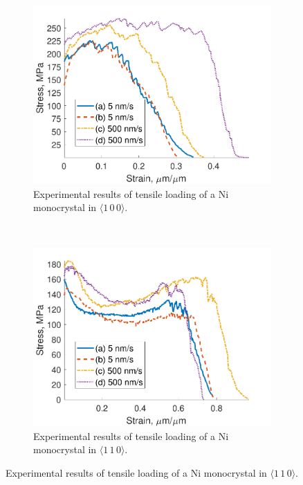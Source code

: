\begin{figure}
    \centering
    \begin{subfigure}[t]{0.45\linewidth}
        \centering
        \includegraphics[width=\linewidth]{../data/Ni100.pdf}
        \caption{Experimental results of tensile loading of a Ni monocrystal in $\langle 1\, 0\, 0 \rangle$.}
        \label{sf:Ni100}
    \end{subfigure}
    ~
    \begin{subfigure}[t]{0.45\linewidth}
        \centering
        \includegraphics[width=\linewidth]{../data/Ni110.pdf}
        \caption{Experimental results of tensile loading of a Ni monocrystal in  $\langle 1\, 1\, 0 \rangle$.}
        \label{sf:Ni110}
    \end{subfigure}


\end{figure}
